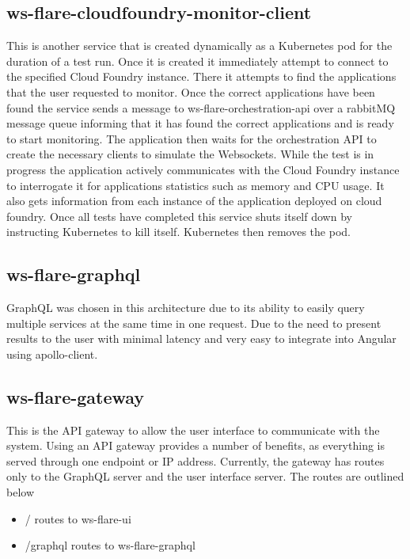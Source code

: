 \subsection{ws-flare-cloudfoundry-monitor-client}

This is another service that is created dynamically as a Kubernetes pod for the duration of a test run. Once it is created it immediately attempt to connect to the specified Cloud Foundry instance. There it attempts to find the applications that the user requested to monitor. Once the correct applications have been found the service sends a message to ws-flare-orchestration-api over a rabbitMQ message queue informing that it has found the correct applications and is ready to start monitoring. The application then waits for the orchestration API to create the necessary clients to simulate the Websockets. While the test is in progress the application actively communicates with the Cloud Foundry instance to interrogate it for applications statistics such as memory and CPU usage. It also gets information from each instance of the application deployed on cloud foundry. Once all tests have completed this service shuts itself down by instructing Kubernetes to kill itself. Kubernetes then removes the pod.

\subsection{ws-flare-graphql}

GraphQL was chosen in this architecture due to its ability to easily query multiple services at the same time in one request. Due to the need to present results to the user with minimal latency and very easy to integrate into Angular using apollo-client.

\subsection{ws-flare-gateway}

This is the API gateway to allow the user interface to communicate with the system. Using an API gateway provides a number of benefits, as everything is served through one endpoint or IP address. Currently, the gateway has routes only to the GraphQL server and the user interface server. The routes are outlined below

\begin{itemize}
  \item / routes to ws-flare-ui
  \item /graphql routes to ws-flare-graphql
\end{itemize}

